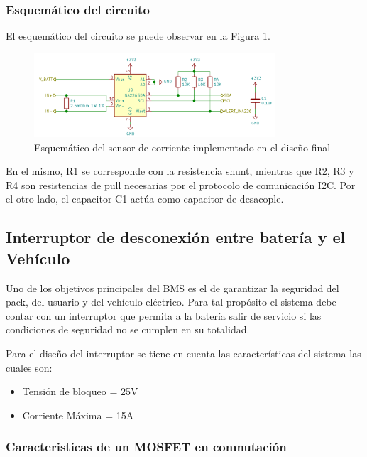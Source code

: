 \documentclass[10pt,a4paper]{article}
\begin{document}
\subsubsection{Esquem\'atico del circuito}

El esquem\'atico del circuito se puede observar en la Figura \ref{ina226_sch}.

\begin{figure}[h!]
    \begin{center}
        \includegraphics[width=0.8\textwidth]{ina226_sch.png}
        \caption{Esquem\'atico del sensor de corriente implementado en el diseño
                 final}
        \label{ina226_sch}
    \end{center}
\end{figure}

En el mismo, R1 se corresponde con la resistencia shunt, mientras que R2, R3 y
R4 son resistencias de pull necesarias por el protocolo de comunicaci\'on I2C.
Por el otro lado, el capacitor C1 act\'ua como capacitor de desacople.

\subsection{Interruptor de desconexión entre batería y el Vehículo}

Uno de los objetivos principales del BMS es el de garantizar la seguridad del
pack, del usuario y del vehículo eléctrico. Para tal propósito el sistema debe
contar con un interruptor que permita a la batería salir de servicio si las
condiciones de seguridad no se cumplen en su totalidad.

Para el diseño del interruptor se tiene en cuenta las características del
sistema las cuales son:

\begin{itemize}
	\item Tensión de bloqueo = 25V
	\item Corriente Máxima = 15A
\end{itemize}

\subsubsection{Caracteristicas de un MOSFET en conmutación}
\end{document}
